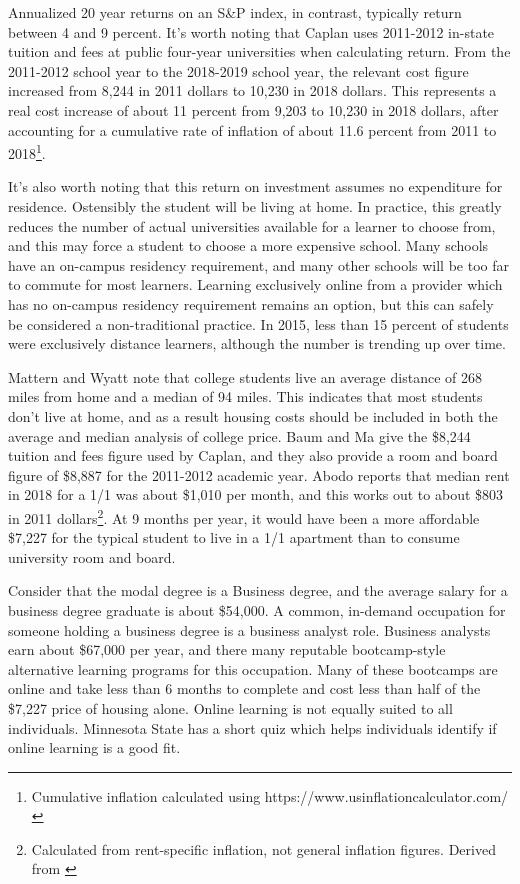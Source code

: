 \documentclass[AER]{/Users/zyl357/Documents/GitHub/research-dissertation-case-for-alt-ed/papers/alt-ed-survey/aea-latex-templates/AEA}
\begin{document}
Annualized 20 year returns on an S\&P index, in contrast, typically
return between 4 and 9 percent\cite{isbitts_2018}. It’s worth noting that Caplan uses 2011-2012
in-state tuition and fees at public four-year universities when
calculating return. From the 2011-2012 school year to the 2018-2019 school
year, the relevant cost figure increased from 8,244 in 2011 dollars to
10,230 in 2018 dollars\cite{collegeboard2018fiveyearchange}. This represents a real cost increase of about 11 percent
from 9,203 to 10,230 in 2018 dollars, after accounting for a cumulative
rate of inflation of about 11.6 percent from 2011 to 2018\footnote{Cumulative inflation calculated using https://www.usinflationcalculator.com/}.

It’s also worth noting that this return on investment assumes no
expenditure for residence. Ostensibly the student will be living at home.
In practice, this greatly reduces the number of actual universities
available for a learner to choose from, and this may force a student to
choose a more expensive school. Many schools have an on-campus residency
requirement, and many other schools will be too far to commute for most
learners. Learning exclusively online from a provider which has no
on-campus residency requirement remains an option, but this can safely be
considered a non-traditional practice. In 2015, less than 15 percent of students
were exclusively distance learners\cite{nces2016percentexclusivelydistance}, although the number is trending up
over time.

Mattern and Wyatt note that college students live an average distance of
268 miles from home and a median of 94 miles. This indicates that most
students don’t live at home, and as a result housing costs should be
included in both the average and median analysis of college price. Baum
and Ma give the \$8,244 tuition and fees figure used by Caplan, and they
also provide a room and board figure of \$8,887 for the 2011-2012 academic
year. Abodo reports that median rent in 2018 for a 1/1 was about \$1,010
per month\cite{abodo_2019}, and this works out to about \$803 in 2011
dollars\footnote{Calculated from rent-specific inflation, not general inflation
figures. Derived from \cite{alioth2019}}. At 9 months
per year, it would have been a more affordable \$7,227 for the typical
student to live in a 1/1 apartment than to consume university room and
board.

Consider that the modal degree is a Business degree, and the average
salary for a business degree graduate is about \$54,000\cite{adams2013college}. A common,
in-demand occupation for someone holding a business degree is a business
analyst role. Business analysts earn about \$67,000 per year, and there
many reputable bootcamp-style alternative learning programs for this
occupation\cite{white_2018}. Many of these bootcamps are online and take less than 6 months
to complete and cost less than half of the \$7,227 price of housing alone.
Online learning is not equally suited to all individuals. Minnesota State
has a short quiz which helps individuals identify if online learning is a
good fit\cite{minnstate2019areonlinecoursesright}.
\end{document}
